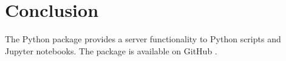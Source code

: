 

\chapter{Conclusion}
\label{chap:Conclusion}

The \libraddask{} Python package provides a \libradtran{} server functionality to Python scripts and Jupyter notebooks.  The package is available on GitHub \cite{Willerslibraddask2020}.

